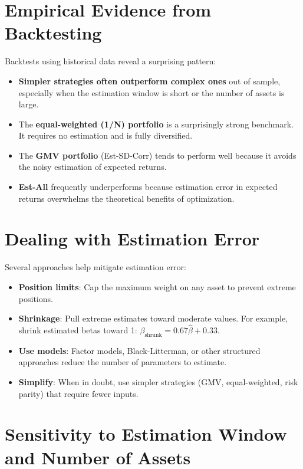 \documentclass[11pt,letterpaper]{report}
\begin{document}
\section{Empirical Evidence from Backtesting}


Backtests using historical data reveal a surprising pattern:

\begin{itemize}
  \item \textbf{Simpler strategies often outperform complex ones} out of sample, especially when the estimation window is short or the number of assets is large.
  \item The \textbf{equal-weighted (1/N) portfolio} is a surprisingly strong benchmark.  It requires no estimation and is fully diversified.
  \item The \textbf{GMV portfolio} (Est-SD-Corr) tends to perform well because it avoids the noisy estimation of expected returns.
  \item \textbf{Est-All} frequently underperforms because estimation error in expected returns overwhelms the theoretical benefits of optimization.
\end{itemize}

\section{Dealing with Estimation Error}


Several approaches help mitigate estimation error:

\begin{itemize}
  \item \textbf{Position limits}: Cap the maximum weight on any asset to prevent extreme positions.
  \item \textbf{Shrinkage}: Pull extreme estimates toward moderate values.  For example, shrink estimated betas toward 1: $\beta_{\text{shrunk}} = 0.67 \hat{\beta} + 0.33$.
  \item \textbf{Use models}: Factor models, Black-Litterman, or other structured approaches reduce the number of parameters to estimate.
  \item \textbf{Simplify}: When in doubt, use simpler strategies (GMV, equal-weighted, risk parity) that require fewer inputs.
\end{itemize}

\section{Sensitivity to Estimation Window and Number of Assets}
\end{document}
